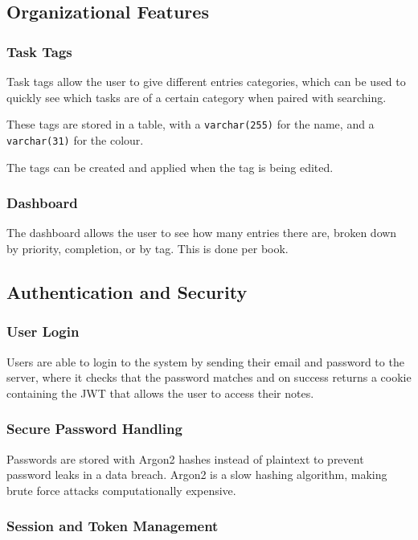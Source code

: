 \subsection{Organizational Features}
\subsubsection{Task Tags}
Task tags allow the user to give different entries categories, which can be used to quickly see which tasks are of a certain category when paired with searching.

These tags are stored in a table, with a \verb|varchar(255)| for the name, and a \verb|varchar(31)| for the colour.

The tags can be created and applied when the tag is being edited.


\subsubsection{Dashboard}
The dashboard allows the user to see how many entries there are, broken down by priority, completion, or by tag. This is done per book.



\subsection{Authentication and Security}

\subsubsection{User Login}
Users are able to login to the system by sending their email and password to the server, where it checks that the password matches and on success returns a cookie containing the JWT that allows the user to access their notes. 

\subsubsection{Secure Password Handling}

Passwords are stored with Argon2 hashes instead of plaintext to prevent password leaks in a data breach. Argon2 is a slow hashing algorithm, making brute force attacks computationally expensive.

\subsubsection{Session and Token Management}

